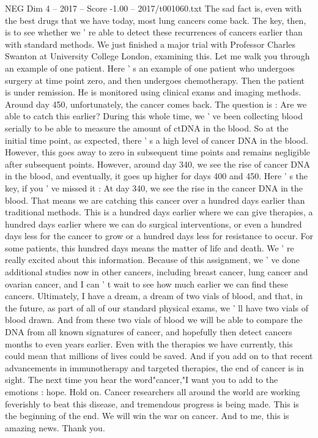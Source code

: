 \begin{textsample}{NEG Dim 4 – 2017 – Score -1.00 – 2017/t001060.txt}
The sad fact is, even with the best drugs that we have today, most lung cancers come back.
The key, then, is to see whether we ' re able to detect these recurrences of cancers earlier than with standard methods.
We just finished a major trial with Professor Charles Swanton at University College London, examining this.
Let me walk you through an example of one patient.
Here ' s an example of one patient who undergoes surgery at time point zero, and then undergoes chemotherapy.
Then the patient is under remission.
He is monitored using clinical exams and imaging methods.
Around day 450, unfortunately, the cancer comes back.
The question is : Are we able to catch this earlier?
During this whole time, we ' ve been collecting blood serially to be able to measure the amount of ctDNA in the blood.
So at the initial time point, as expected, there ' s a high level of cancer DNA in the blood.
However, this goes away to zero in subsequent time points and remains negligible after subsequent points.
However, around day 340, we see the rise of cancer DNA in the blood, and eventually, it goes up higher for days 400 and 450.
Here ' s the key, if you ' ve missed it : At day 340, we see the rise in the cancer DNA in the blood.
That means we are catching this cancer over a hundred days earlier than traditional methods.
This is a hundred days earlier where we can give therapies, a hundred days earlier where we can do surgical interventions, or even a hundred days less for the cancer to grow or a hundred days less for resistance to occur.
For some patients, this hundred days means the matter of life and death.
We ' re really excited about this information.
Because of this assignment, we ' ve done additional studies now in other cancers, including breast cancer, lung cancer and ovarian cancer, and I can ' t wait to see how much earlier we can find these cancers.
Ultimately, I have a dream, a dream of two vials of blood, and that, in the future, as part of all of our standard physical exams, we ' ll have two vials of blood drawn.
And from these two vials of blood we will be able to compare the DNA from all known signatures of cancer, and hopefully then detect cancers months to even years earlier.
Even with the therapies we have currently, this could mean that millions of lives could be saved.
And if you add on to that recent advancements in immunotherapy and targeted therapies, the end of cancer is in sight.
The next time you hear the word"cancer,"I want you to add to the emotions : hope.
Hold on.
Cancer researchers all around the world are working feverishly to beat this disease, and tremendous progress is being made.
This is the beginning of the end.
We will win the war on cancer.
And to me, this is amazing news.
Thank you.

\end{textsample}
